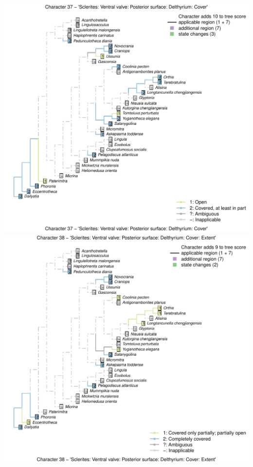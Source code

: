 \documentclass[]{book}
\theoremstyle{definition}
\theoremstyle{definition}
\theoremstyle{definition}
\theoremstyle{remark}
\begin{document}
\includegraphics{Brachiopod_phylogeny_files/figure-latex/unnamed-chunk-4-37.pdf}
\includegraphics{Brachiopod_phylogeny_files/figure-latex/unnamed-chunk-4-38.pdf}
\end{document}
